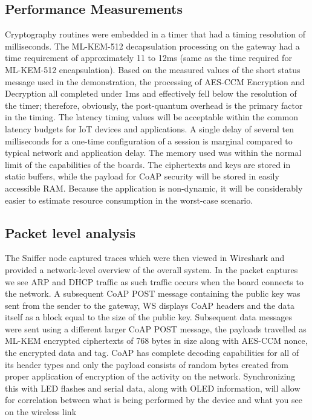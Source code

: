 \documentclass[USenglish,oneside,twocolumn]{article}
\begin{document}
    \subsection{Performance Measurements}
    Cryptography routines were embedded in a timer that had a timing resolution of milliseconds. The ML-KEM-512 decapsulation processing on the gateway had a time requirement of approximately 11 to 12ms (same as the time required for ML-KEM-512 encapsulation). Based on the measured values of the short status message used in the demonstration, the processing of AES-CCM Encryption and Decryption all completed under 1ms and effectively fell below the resolution of the timer; therefore, obviously, the post-quantum overhead is the primary factor in the timing. The latency timing values will be acceptable within the common latency budgets for IoT devices and applications. A single delay of several ten milliseconds for a one-time configuration of a session is marginal compared to typical network and application delay. The memory used was within the normal limit of the capabilities of the boards. The ciphertexts and keys are stored in static buffers, while the payload for CoAP security will be stored in easily accessible RAM. Because the application is non-dynamic, it will be considerably easier to estimate resource consumption in the worst-case scenario.
    \subsection{Packet level analysis}
    The Sniffer node captured traces which were then viewed in Wireshark and provided a network-level overview of the overall system. In the packet captures we see ARP and DHCP traffic as such traffic occurs when the board connects to the network. A subsequent CoAP POST message containing the public key was sent from the sender to the gateway, WS displays CoAP headers and the data itself as a block equal to the size of the public key. Subsequent data messages were sent using a different larger CoAP POST message, the payloads travelled as ML-KEM encrypted ciphertexts of 768 bytes in size along with AES-CCM nonce, the encrypted data and tag. CoAP has complete decoding capabilities for all of its header types and only the payload consists of random bytes created from proper application of encryption of the activity on the network. Synchronizing this with LED flashes and serial data, along with OLED information, will allow for correlation between what is being performed by the device and what you see on the wireless link
\end{document}
